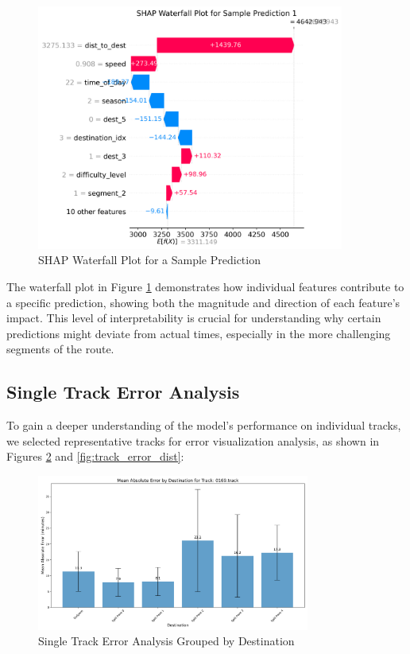 \documentclass[12pt]{article}
\begin{document}
\begin{figure}[H]
\centering
\includegraphics[width=0.9\textwidth]{visualization_results/shap_waterfall_sample_1.png}
\caption{SHAP Waterfall Plot for a Sample Prediction}
\label{fig:shap_waterfall}
\end{figure}

The waterfall plot in Figure \ref{fig:shap_waterfall} demonstrates how individual features contribute to a specific prediction, showing both the magnitude and direction of each feature's impact. This level of interpretability is crucial for understanding why certain predictions might deviate from actual times, especially in the more challenging segments of the route.

\subsection{Single Track Error Analysis}

To gain a deeper understanding of the model's performance on individual tracks, we selected representative tracks for error visualization analysis, as shown in Figures \ref{fig:track_error} and \ref{fig:track_error_dist}:

\begin{figure}[H]
\centering
\includegraphics[width=0.8\textwidth]{visualization_results/track_error_by_dest_0169.track.png}
\caption{Single Track Error Analysis Grouped by Destination}
\label{fig:track_error}
\end{figure}
\end{document}
